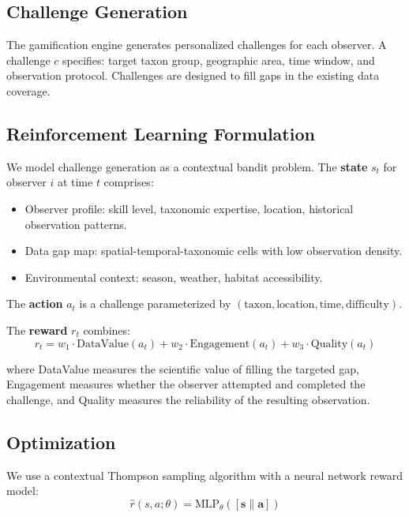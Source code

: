 \documentclass[11pt,a4paper]{article}
\begin{document}
\subsection{Challenge Generation}

The gamification engine generates personalized challenges for each
observer. A challenge $c$ specifies: target taxon group, geographic
area, time window, and observation protocol. Challenges are designed
to fill gaps in the existing data coverage.

\subsection{Reinforcement Learning Formulation}

We model challenge generation as a contextual bandit problem. The
\textbf{state} $s_t$ for observer $i$ at time $t$ comprises:
\begin{itemize}
  \item Observer profile: skill level, taxonomic expertise, location,
    historical observation patterns.
  \item Data gap map: spatial-temporal-taxonomic cells with low
    observation density.
  \item Environmental context: season, weather, habitat accessibility.
\end{itemize}

The \textbf{action} $a_t$ is a challenge parameterized by
$(\text{taxon}, \text{location}, \text{time}, \text{difficulty})$.

The \textbf{reward} $r_t$ combines:
\begin{equation}
  r_t = w_1 \cdot \text{DataValue}(a_t) + w_2 \cdot \text{Engagement}(a_t)
  + w_3 \cdot \text{Quality}(a_t)
  \label{eq:reward}
\end{equation}

where DataValue measures the scientific value of filling the targeted
gap, Engagement measures whether the observer attempted and completed
the challenge, and Quality measures the reliability of the resulting
observation.

\subsection{Optimization}

We use a contextual Thompson sampling algorithm
\citep{agrawal2013thompson} with a neural network reward model:
\begin{equation}
  \hat{r}(s, a; \theta) = \text{MLP}_\theta([\mathbf{s} \| \mathbf{a}])
\end{equation}
\end{document}
